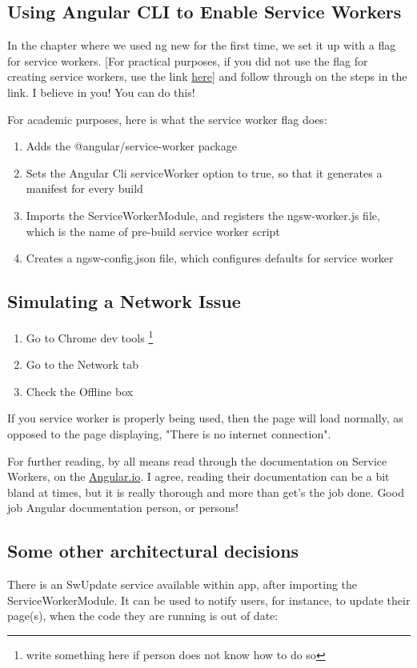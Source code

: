 \subsection{ Using Angular CLI to Enable Service Workers }
In the chapter where we used ng new for the first time, we set it up with a flag
for service workers. [For practical purposes, if you did not use the flag for
creating service workers, use the link \href{https://angular.io/guide/service-worker-getting-started}{here}]
and follow through on the steps in the link. I believe in you! You can do this!

For academic purposes, here is what the service worker flag does:
\begin{enumerate}
  \item Adds the @angular/service-worker package
  \item Sets the Angular Cli serviceWorker option to true, so that it generates
  a manifest for every build
  \item Imports the ServiceWorkerModule, and registers the ngsw-worker.js file,
  which is the name of pre-build service worker script
  \item Creates a ngsw-config.json file, which configures defaults for service
  worker
\end{enumerate}

\subsection{ Simulating a Network Issue }
\begin{enumerate}
  \item Go to Chrome dev tools \footnote{write something here if person does not know how
  to do so}
  \item Go to the Network tab
  \item Check the Offline box
\end{enumerate}

If you service worker is properly being used, then the page will load normally,
as opposed to the page displaying, "There is no internet connection".

For further reading, by all means read through the documentation on Service
Workers, on the \href{https://angular.io/guide/service-worker-getting-started}{Angular.io}.
I agree, reading their documentation can be a bit bland at times, but it is
really thorough and more than get's the job done. Good job Angular documentation
person, or persons!

\subsection{ Some other architectural decisions }
There is an SwUpdate service available within app, after importing the
ServiceWorkerModule. It can be used to notify users, for instance, to update
their page(s), when the code they are running is out of date:
